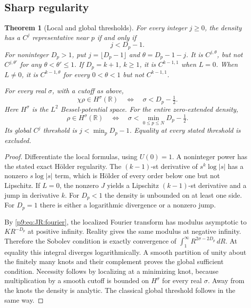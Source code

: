 \documentclass[11pt,a4paper]{article}
\newtheorem{theorem}{Theorem}[section]
\theoremstyle{definition}
\theoremstyle{remark}
\numberwithin{equation}{section}
\begin{document}
\subsection{Sharp regularity}

\begin{theorem}[Local and global thresholds]\label{p9:thm:JR:regularity}
For every integer \(j\ge0\), the density has a \(C^j\) representative
near \(p\) if and only if
\[
 j<D_p-1.
\]
For noninteger \(D_p>1\), put \(j=\lfloor D_p-1\rfloor\) and
\(\theta=D_p-1-j\). It is \(C^{j,\theta}\), but not
\(C^{j,\theta'}\) for any \(\theta<\theta'\le1\).
If \(D_p=k+1\), \(k\ge1\), it is \(C^{k-1,1}\) when \(L=0\).
When \(L\ne0\), it is \(C^{k-1,\theta}\) for every \(0<\theta<1\)
but not \(C^{k-1,1}\).

For every real \(\sigma\), with a cutoff as above,
\begin{equation}\label{p9:eq:JR:Hlocal}
 \chi\rho\in H^\sigma(\mathbb R)
 \quad\Longleftrightarrow\quad \sigma<D_p-\tfrac12 .
\end{equation}
Here \(H^\sigma\) is the \(L^2\) Bessel-potential space.
For the entire zero-extended density,
\begin{equation}\label{p9:eq:JR:Hglobal}
 \rho\in H^\sigma(\mathbb R)
 \quad\Longleftrightarrow\quad
 \sigma<\min_{0\le p\le N}D_p-\tfrac12 .
\end{equation}
Its global \(C^j\) threshold is \(j<\min_pD_p-1\).
Equality at every stated threshold is excluded.
\end{theorem}

\begin{proof}
Differentiate the local formulas, using \(U(0)=1\).
A noninteger power has the stated exact H\"older regularity.
The \((k-1)\)-st derivative of \(s^k\log|s|\) has a nonzero
\(s\log|s|\) term, which is H\"older of every order below one but
not Lipschitz. If \(L=0\), the nonzero \(J\) yields a Lipschitz
\((k-1)\)-st derivative and a jump in derivative \(k\).
For \(D_p<1\) the density is unbounded on at least one side.
For \(D_p=1\) there is either a logarithmic divergence or a nonzero jump.

By \eqref{p9:eq:JR:fourier}, the localized Fourier transform has modulus
asymptotic to \(KR^{-D_p}\) at positive infinity. Reality gives the
same modulus at negative infinity. Therefore the Sobolev condition is
exactly convergence of \(\int_1^\infty R^{2\sigma-2D_p}\,dR\).
At equality this integral diverges logarithmically.
A smooth partition of unity about the finitely many knots and their
complement proves the global sufficient condition. Necessity follows
by localizing at a minimizing knot, because multiplication by a smooth
cutoff is bounded on \(H^\sigma\) for every real \(\sigma\).
Away from the knots the density is analytic. The classical global
threshold follows in the same way.
\end{proof}
\end{document}
